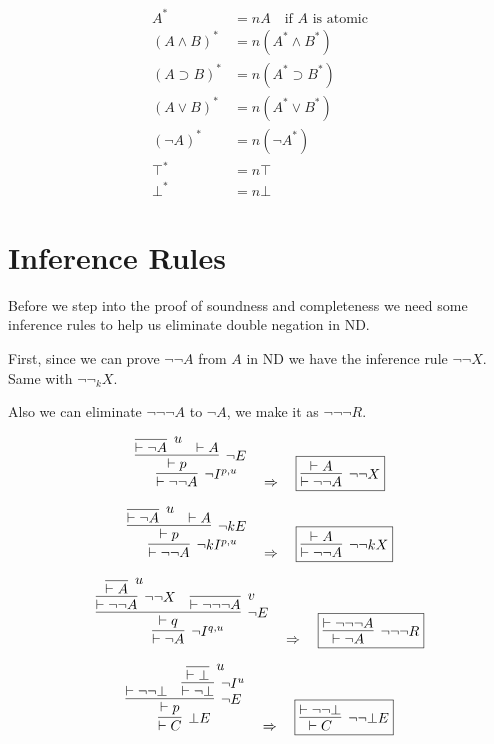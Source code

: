 \documentclass{article}
\begin{document}
\begin{align*}
A^* &= nA \quad \text{if } A \text{ is atomic} \\
(A \land B)^* &= n(A^* \land B^*) \\
(A \supset B)^* &= n(A^* \supset B^*) \\
(A \lor B)^* &= n(A^* \lor B^*) \\
(\neg A)^* &= n(\neg A^*) \\
\top^* &= n\top \\
\bot^* &= n\bot
\end{align*}




\section{Inference Rules}
Before we step into the proof of soundness and completeness we need some 
inference rules to help us eliminate double negation in ND.

First, since we can prove $\neg\neg A$ from $A$ in ND we 
have the inference rule $\neg\neg X$. Same with $\neg\neg_{k}X$.

Also we can eliminate $\neg\neg\neg A$ to $\neg A$, we make 
it as $\neg\neg\neg R$.

\[
\infer[\neg I^{p,u}]{\vdash \neg\neg A}{
    \infer[\neg E]{\vdash p}{
        \infer [u]{\vdash \neg A}{} & \vdash A
    }
}
\quad \Rightarrow \quad
\fbox{$
    \infer[\neg \neg X]{\vdash \neg \neg A}{\vdash A}
$}
\]

\[
\infer[\neg kI^{p,u}]{\vdash \neg\neg A}{
    \infer[\neg kE]{\vdash p}{
        \infer [u]{\vdash \neg A}{} & \vdash A
    }
}
\quad \Rightarrow \quad
\fbox{$
    \infer[\neg \neg kX]{\vdash \neg \neg A}{\vdash A}
$}
\]

\[
    \infer[\neg I^{q,u}]{\vdash \neg A}{
        \infer[\neg E]{\vdash q}{ 
              \infer[\neg \neg X]{\vdash \neg \neg A}{\infer[u]{\vdash A}{}} &
              \infer[v]{\vdash \neg \neg \neg A}{}
        }
      }
\quad \Rightarrow \quad
\fbox{$
    \infer [\neg \neg \neg R]
    {\vdash \neg A}
    {\vdash \neg\neg \neg A} 
$}
\]

\[
\infer[\bot E]{\vdash C}{
  \infer[\neg E]{\vdash p}{
    \vdash \neg\neg\bot
    &
    \infer[\neg I^{u}]{\vdash \neg\bot}{
      \infer[u]{\vdash \bot}{}
    }
  }
}
\quad \Rightarrow \quad
\fbox{$
  \infer[\neg\neg\bot E]{\vdash C}{\vdash \neg\neg\bot}
$}
\]
\end{document}
